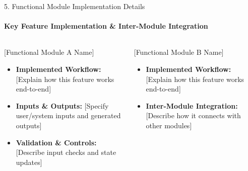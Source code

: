 \documentclass[aspectratio=169, 11pt]{beamer}
\begin{document}
\begin{frame}{5. Functional Module Implementation Details}
    \framesubtitle{Key Feature Implementation \& Inter-Module Integration}
    \begin{columns}[T]
        \begin{block}{[Functional Module A Name]}
            \footnotesize
            \begin{itemize}
                \item \textbf{Implemented Workflow:} {[Explain how this feature works end-to-end]}
                \item \textbf{Inputs \& Outputs:} {[Specify user/system inputs and generated outputs]}
                \item \textbf{Validation \& Controls:} {[Describe input checks and state updates]}
            \end{itemize}
        \end{block}

        \begin{block}{[Functional Module B Name]}
            \footnotesize
            \begin{itemize}
                \item \textbf{Implemented Workflow:} {[Explain how this feature works end-to-end]}
                \item \textbf{Inter-Module Integration:} {[Describe how it connects with other modules]}
            \end{itemize}
        \end{block}

        \centering
        \vspace{0.2cm}
    \end{columns}
\end{frame}

\end{document}

